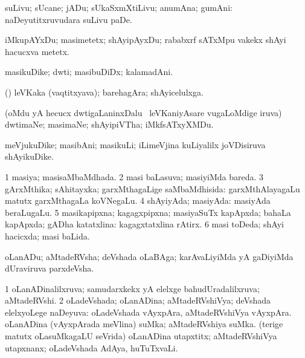 \bentry
{}
\gl{}
\bmng
\emng
\eentry

\bentry
{}
\gl{\nA}
\bmng
suLivu; sUcane; jADu; sUkaSxmXtiLivu; anumAna; gumAni:  naDeyutitxruvudara suLivu paDe. 
\emng
\eentry

\bentry
{}
\gl{\nA}
\bmng
iMkupAYxDu; masimetetx; shAyipAyxDu; rababxrf sATxMpu \mo vakekx shAyi hacucxva metetx. 
\emng
\eentry

\bentry
{}
\gl{\nA}
\bmng
masikuDike; dwti; masibuDiDx; kalamadAni. 
\emng
\eentry

\bentry
{}
\gl{\nA}
\bmng
(\hiV) leVKaka (vaqtitxyava); barehagAra; shAyicelulxga. 
\emng
\eentry

\bentry
{}
\gl{\nA}
\bmng
(oMdu yA hecucx dwtigaLaninxDalu \sA\ leVKaniyAsare \mo vugaLoMdige iruva) dwtimaNe; masimaNe; shAyipiVTha; iMkfsATxyXMDu. 
\emng
\eentry

\bentry
{}
\gl{\nA}
\bmng
meVjukuDike; masibAni; masikuLi; iLimeVjina kuLiyalilx joVDisiruva shAyikuDike. 
\emng
\eentry

\bentry
{}
\gl{\gu}
\bmng
\bnum
\num{1} masiya; masisaMbaMdhada. 
\num{2} masi baLasuva; masiyiMda bareda. 
\num{3} gArxMthika; sAhitayxka; garxMthagaLige saMbaMdhisida:  garxMthAlayagaLu matutx garxMthagaLa koVNegaLu. 
\num{4} shAyiyAda; masiyAda:  masiyAda beraLugaLu. 
\num{5} masikapipxna; kagagxpipxna; masiyaSuTx kapApxda; bahaLa kapApxda; gADha katatxlina:  kagagxtatxlina rAtirx. 
\num{6} masi toDeda; shAyi hacicxda; masi baLida. 
\enum
\emng
\eentry

\bentry
{}
\gl{\nA}
\bmng
oLanADu; aMtadeRVsha; deVshada oLaBAga; karAvaLiyiMda yA gaDiyiMda dUraviruva parxdeVsha. 
\emng
\eentry

\bentry
{}
\gl{\gu}
\bmng
\bnum
\num{1} oLanADinalilxruva; samudarxkekx yA elelxge bahudUradalilxruva; aMtadeRVshi. 
\num{2} oLadeVshada; oLanADina; aMtadeRVshiVya; deVshada elelxyoLege naDeyuva:  oLadeVshada vAyxpAra, aMtadeRVshiVya vAyxpAra.  oLanADina (vAyxpArada meVlina) suMka; aMtadeRVshiya suMka.  (terige matutx oLasuMkagaLU seVrida) oLanADina utapxtitx; aMtadeRVshiVya utapxnanx; oLadeVshada AdAya, huTuTxvaLi. 
\enum
\emng
\eentry

